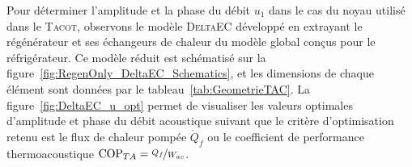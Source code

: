 Pour déterminer l'amplitude et la phase du débit $u_1$ dans le cas du noyau utilisé dans le \textsc{Tacot}, observons le modèle \textsc{DeltaEC} développé en extrayant le régénérateur et ses échangeurs de chaleur du modèle global conçus pour le réfrigérateur. Ce modèle réduit est schématisé sur la figure~\ref{fig:RegenOnly_DeltaEC_Schematics}, et les dimensions de chaque élément sont données par le tableau~\ref{tab:GeometrieTAC}. La figure~\ref{fig:DeltaEC_u_opt} permet de visualiser les valeurs optimales d'amplitude et phase du débit acoustique suivant que le critère d'optimisation retenu est le flux de chaleur pompée $\dot Q_f$ ou le coefficient de performance thermoacoustique $\mathrm{COP}_{TA}=\nicefrac{Q_f}{W_{ac}}$.

